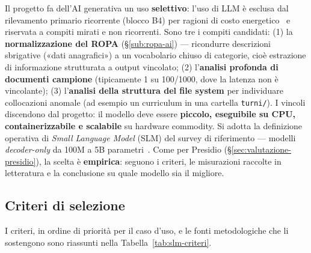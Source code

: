 Il progetto fa dell'AI generativa un uso \textbf{selettivo}: l'uso di LLM è esclusa dal rilevamento primario ricorrente (blocco B4) per ragioni di costo energetico~\cite{luccioni2024energy} e riservata a compiti mirati e non ricorrenti. Sono tre i compiti candidati: (1) la \textbf{normalizzazione del ROPA} (§\ref{sub:ropa-ai}) --- ricondurre descrizioni sbrigative («dati anagrafici») a un vocabolario chiuso di categorie, cioè estrazione di informazione strutturata a output vincolato; (2) l'\textbf{analisi profonda di documenti campione} (tipicamente 1 su 100/1000, dove la latenza non è vincolante); (3) l'\textbf{analisi della struttura del file system} per individuare collocazioni anomale (ad esempio un curriculum in una cartella \texttt{turni/}). I vincoli discendono dal progetto: il modello deve essere \textbf{piccolo, eseguibile su CPU, containerizzabile e scalabile} su hardware commodity. Si adotta la definizione operativa di \textit{Small Language Model} (SLM) del survey di riferimento --- modelli \textit{decoder-only} da 100M a 5B parametri~\cite{lu2024slmsurvey}. Come per Presidio (§\ref{sec:valutazione-presidio}), la scelta è \textbf{empirica}: seguono i criteri, le misurazioni raccolte in letteratura e la conclusione su quale modello sia il migliore.

\subsection{Criteri di selezione}
\label{sub:slm-criteri}

I criteri, in ordine di priorità per il caso d'uso, e le fonti metodologiche che li sostengono sono riassunti nella Tabella~\ref{tab:slm-criteri}.

